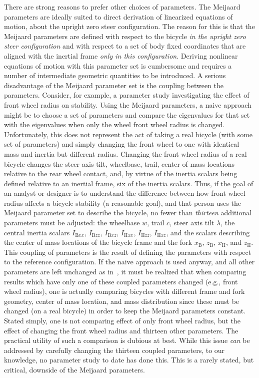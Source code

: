 There are strong reasons to prefer other choices of parameters. The Meijaard
parameters are ideally suited to direct derivation of linearized equations of
motion, about the upright zero steer configuration. The reason for this is that
the Meijaard parameters are defined with respect to the bicycle \textit{in the
upright zero steer configuration} and with respect to a set of body fixed
coordinates that are aligned with the inertial frame \textit{only in this
configuration}. Deriving nonlinear equations of motion with this parameter set
is cumbersome and requires a number of intermediate geometric quantities to be
introduced. A serious disadvantage of the Meijaard parameter set is the
coupling between the parameters. Consider, for example, a parameter study
investigating the effect of front wheel radius on stability. Using the Meijaard
parameters, a naive approach might be to choose a set of parameters and compare
the eigenvalues for that set with the eigenvalues when only the wheel front
wheel radius is changed. Unfortunately, this does not represent the act of
taking a real bicycle (with some set of parameters) and simply changing the
front wheel to one with identical mass and inertia but different radius.
Changing the front wheel radius of a real bicycle changes the steer axis tilt,
wheelbase, trail, center of mass locations relative to the rear wheel contact,
and, by virtue of the inertia scalars being defined relative to an inertial
frame, six of the inertia scalars. Thus, if the goal of an analyst or designer
is to understand the difference between how front wheel radius affects a
bicycle stability (a reasonable goal), and that person uses the Meijaard
parameter set to describe the bicycle, no fewer than \textit{thirteen}
additional parameters must be adjusted: the wheelbase $w$, trail $c$, steer
axis tilt $\lambda$, the central inertia scalars $I_{\text{B}xx}$,
$I_{\text{B}zz}$, $I_{\text{B}xz}$, $I_{\text{H}xx}$, $I_{\text{H}zz}$,
$I_{\text{H}xz}$, and the scalars describing the center of mass locations of
the bicycle frame and the fork $x_\text{B}$, $z_\text{B}$, $x_\text{H}$, and
$z_\text{H}$. This coupling of parameters is the result of defining the
parameters with respect to the reference configuration. If the naive approach
is used anyway, and all other parameters are left unchanged as
in~\cite{Moore2008,Tak2010}, it must be realized that when comparing results
which have only one of these coupled parameters changed (e.g., front wheel
radius), one is actually comparing bicycles with different frame and fork
geometry, center of mass location, and mass distribution since these must be
changed (on a real bicycle) in order to keep the Meijaard parameters constant.
Stated simply, one is not comparing effect of only front wheel radius, but the
effect of changing the front wheel radius and thirteen other parameters. The
practical utility of such a comparison is dubious at best. While this issue
\textit{can} be addressed by carefully changing the thirteen coupled parameters,
to our knowledge, no parameter study to date has done this. This is a rarely
stated, but critical, downside of the Meijaard parameters.


